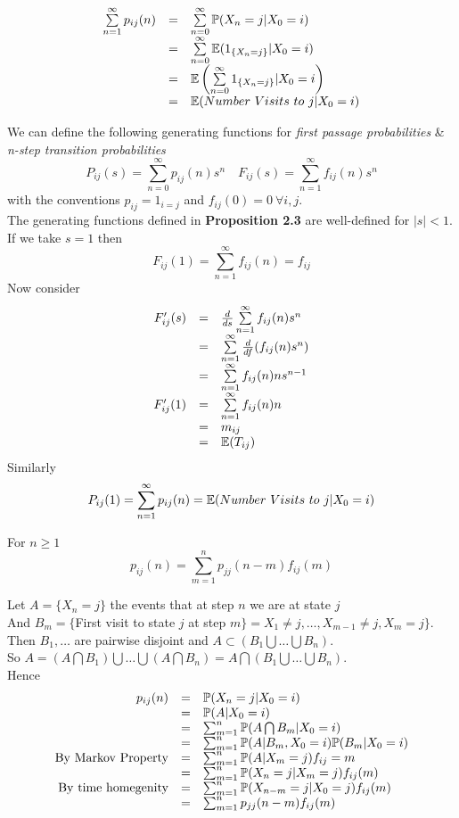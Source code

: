 \documentclass[11pt,a4paper]{article}
\begin{document}
\[\begin{array}{rcl}
\sum\limits_{n=1}^\infty p_{ij}(n)&=&\sum\limits_{n=0}^\infty\mathbb{P}(X_n=j|X_0=i)\\
&=&\sum\limits_{n=0}^\infty\mathbb{E}(1_{\{X_n=j\}}|X_0=i)\\
&=&\mathbb{E}\left(\sum\limits_{n=0}^\infty 1_{\{X_n=j\}}|X_0=i\right)\\
&=&\mathbb{E}(Number\ Visits\ to\ j|X_0=i)
\end{array}\]

We can define the following generating functions for \textit{first passage probabilities} \& \textit{n-step transition probabilities}
$$P_{ij}(s)=\sum_{n=0}^\infty p_{ij}(n)s^n\quad F_{ij}(s)=\sum_{n=1}^\infty f_{ij}(n)s^n$$
with the conventions $p_{ij}=1_{i=j}$ and $f_{ij}(0)=0\ \forall i,j$.\\

The generating functions defined in \textbf{Proposition 2.3} are well-defined for $|s|<1$.\\
If we take $s=1$ then
$$F_{ij}(1)=\sum_{n=1}^\infty f_{ij}(n)=f_{ij}$$
Now consider
\[\begin{array}{rcl}
F_{ij}'(s)&=&\frac{d}{ds}\sum\limits_{n=1}^\infty f_{ij}(n)s^n\\
&=&\sum\limits_{n=1}^\infty\frac{d}{df}(f_{ij}(n)s^n)\\
&=&\sum\limits_{n=1}^\infty f_{ij}(n)ns^{n-1}\\
F_{ij}'(1)&=&\sum\limits_{n=1}^\infty f_{ij}(n)n\\
&=&m_{ij}\\
&=&\mathbb{E}(T_{ij})
\end{array}\]
Similarly
$$P_{ij}(1)=\sum\limits_{n=1}^\infty p_{ij}(n)=\mathbb{E}(Number\ Visits\ to\ j|X_0=i)$$

\theorem{}
For $n\geq1$
$$p_{ij}(n)=\sum_{m=1}^np_{jj}(n-m)f_{ij}(m)$$

\proof{}
Let $A=\{X_n=j\}$ the events that at step $n$ we are at state $j$\\
And $B_m=\{$First visit to state $j$ at step $m\}=X_1\neq j,\dots,X_{m-1}\neq j,X_m=j\}$.\\
Then $B_1,\dots$ are pairwise disjoint and $A\subset(B_1\bigcup\dots\bigcup B_n)$.\\
So $A=(A\bigcap B_1)\bigcup\dots\bigcup(A\bigcap B_n)=A\bigcap(B_1\bigcup\dots\bigcup B_n)$.\\
Hence
\[\begin{array}{rcl}
p_{ij}(n)&=&\prob(X_n=j|X_0=i)\\
&=&\prob(A|X_0=i)\\
&=&\sum_{m=1}^n\prob(A\bigcap B_m|X_0=i)\\
&=&\sum_{m=1}^n\prob(A|B_m,X_0=i)\prob(B_m|X_0=i)\\
\mathrm{By\ Markov\ Property}&=&\sum_{m=1}^n\prob(A|X_m=j)f_{ij}=m\\
&=&\sum_{m=1}^n\prob(X_n=j|X_m=j)f_{ij}(m)\\
\mathrm{By\ time\ homegenity}&=&\sum_{m=1}^n\prob(X_{n-m}=j|X_0=j)f_{ij}(m)\\
&=&\sum_{m=1}^np_{jj}(n-m)f_{ij}(m)
\end{array}\]
\end{document}
